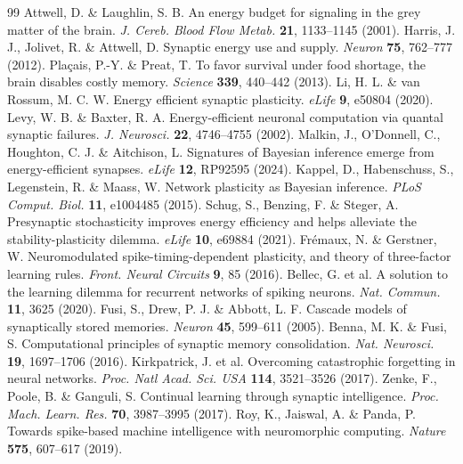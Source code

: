 \documentclass[12pt,a4paper]{article}
\begin{document}
\begin{thebibliography}{99}
\setlength{\itemsep}{0pt}
 Attwell, D. \& Laughlin, S. B. An energy budget for signaling in the grey matter of the brain. \textit{J. Cereb. Blood Flow Metab.} \textbf{21}, 1133--1145 (2001).
 Harris, J. J., Jolivet, R. \& Attwell, D. Synaptic energy use and supply. \textit{Neuron} \textbf{75}, 762--777 (2012).
 Pla\c{c}ais, P.-Y. \& Preat, T. To favor survival under food shortage, the brain disables costly memory. \textit{Science} \textbf{339}, 440--442 (2013).
 Li, H. L. \& van Rossum, M. C. W. Energy efficient synaptic plasticity. \textit{eLife} \textbf{9}, e50804 (2020).
 Levy, W. B. \& Baxter, R. A. Energy-efficient neuronal computation via quantal synaptic failures. \textit{J. Neurosci.} \textbf{22}, 4746--4755 (2002).
 Malkin, J., O'Donnell, C., Houghton, C. J. \& Aitchison, L. Signatures of Bayesian inference emerge from energy-efficient synapses. \textit{eLife} \textbf{12}, RP92595 (2024).
 Kappel, D., Habenschuss, S., Legenstein, R. \& Maass, W. Network plasticity as Bayesian inference. \textit{PLoS Comput. Biol.} \textbf{11}, e1004485 (2015).
 Schug, S., Benzing, F. \& Steger, A. Presynaptic stochasticity improves energy efficiency and helps alleviate the stability-plasticity dilemma. \textit{eLife} \textbf{10}, e69884 (2021).
 Fr\'emaux, N. \& Gerstner, W. Neuromodulated spike-timing-dependent plasticity, and theory of three-factor learning rules. \textit{Front. Neural Circuits} \textbf{9}, 85 (2016).
 Bellec, G. et al. A solution to the learning dilemma for recurrent networks of spiking neurons. \textit{Nat. Commun.} \textbf{11}, 3625 (2020).
 Fusi, S., Drew, P. J. \& Abbott, L. F. Cascade models of synaptically stored memories. \textit{Neuron} \textbf{45}, 599--611 (2005).
 Benna, M. K. \& Fusi, S. Computational principles of synaptic memory consolidation. \textit{Nat. Neurosci.} \textbf{19}, 1697--1706 (2016).
 Kirkpatrick, J. et al. Overcoming catastrophic forgetting in neural networks. \textit{Proc. Natl Acad. Sci. USA} \textbf{114}, 3521--3526 (2017).
 Zenke, F., Poole, B. \& Ganguli, S. Continual learning through synaptic intelligence. \textit{Proc. Mach. Learn. Res.} \textbf{70}, 3987--3995 (2017).
 Roy, K., Jaiswal, A. \& Panda, P. Towards spike-based machine intelligence with neuromorphic computing. \textit{Nature} \textbf{575}, 607--617 (2019).

\end{thebibliography}
\end{document}
